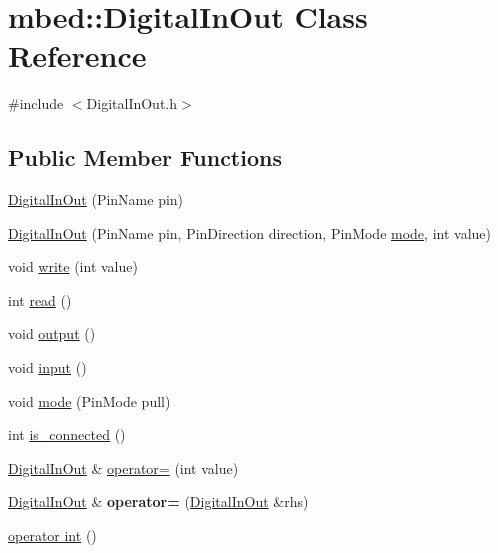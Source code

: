 \hypertarget{classmbed_1_1DigitalInOut}{}\section{mbed\+:\+:Digital\+In\+Out Class Reference}
\label{classmbed_1_1DigitalInOut}


{\ttfamily \#include $<$Digital\+In\+Out.\+h$>$}

\subsection*{Public Member Functions}
\begin{DoxyCompactItemize}
\item 
\hyperlink{classmbed_1_1DigitalInOut_a45aeb16f525f8fd23b468b761d44034a}{Digital\+In\+Out} (Pin\+Name pin)
\item 
\hyperlink{classmbed_1_1DigitalInOut_acdebfaf292d2c361db6a3040e4d34c8c}{Digital\+In\+Out} (Pin\+Name pin, Pin\+Direction direction, Pin\+Mode \hyperlink{classmbed_1_1DigitalInOut_ac055602d6e364974d9096d6a9cdeaa45}{mode}, int value)
\item 
void \hyperlink{classmbed_1_1DigitalInOut_a2407c36ddf7aeca0a3d941d13001431b}{write} (int value)
\item 
int \hyperlink{classmbed_1_1DigitalInOut_a19cf94937f2ab85012fc5418e5808c44}{read} ()
\item 
void \hyperlink{classmbed_1_1DigitalInOut_acc847afdb691a4628ac23612d7944e6b}{output} ()
\item 
void \hyperlink{classmbed_1_1DigitalInOut_acc7775ff8fe2e40cc2882ce2a2e2e3d0}{input} ()
\item 
void \hyperlink{classmbed_1_1DigitalInOut_ac055602d6e364974d9096d6a9cdeaa45}{mode} (Pin\+Mode pull)
\item 
int \hyperlink{classmbed_1_1DigitalInOut_a185f22a87707167a3841e1d62b6e2736}{is\+\_\+connected} ()
\item 
\hyperlink{classmbed_1_1DigitalInOut}{Digital\+In\+Out} \& \hyperlink{classmbed_1_1DigitalInOut_a055dae2e002e9a95a06462746fb1685f}{operator=} (int value)
\item 
\hyperlink{classmbed_1_1DigitalInOut}{Digital\+In\+Out} \& {\bfseries operator=} (\hyperlink{classmbed_1_1DigitalInOut}{Digital\+In\+Out} \&rhs)\hypertarget{classmbed_1_1DigitalInOut_a6d1174bf281a925f52a63157819425d9}{}\label{classmbed_1_1DigitalInOut_a6d1174bf281a925f52a63157819425d9}

\item 
\hyperlink{classmbed_1_1DigitalInOut_ace8466be1d1a836a1ecb1dd1621af7a2}{operator int} ()
\end{DoxyCompactItemize}
